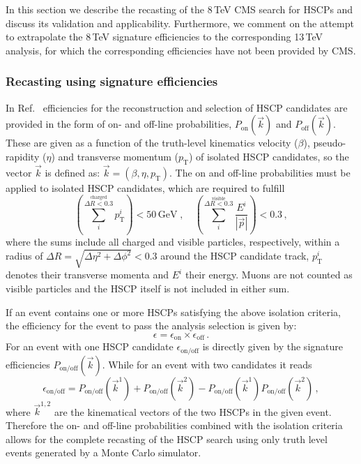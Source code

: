 In this section we describe the recasting of the 8\,TeV CMS
search for HSCPs and discuss its validation and applicability.
Furthermore, we comment on the attempt to extrapolate
the 8\,TeV signature efficiencies to the corresponding 13\,TeV analysis, for
which the corresponding efficiencies have not been provided by CMS\@.


\subsubsection{Recasting using signature efficiencies}\label{sec:signatureeff}


In Ref.~\cite{Khachatryan:2015lla} efficiencies for the reconstruction
and selection of HSCP candidates are provided in the form of on- and
off-line probabilities, $P_\text{on}(\vec{k})$ and $P_\text{off}(\vec{k})$.
These are given as a function of the truth-level kinematics 
velocity ($\beta$), pseudo-rapidity ($\eta$) and 
transverse momentum ($p_\text{T}$) of isolated HSCP candidates, so
the vector $\vec{k}$ is defined as: $\vec{k}=(\beta,\eta,p_\text{T})$.
The on and off-line probabilities must be applied to 
isolated HSCP candidates, which are required to fulfill
\begin{equation}
\left( \sum_{i}^{\stackrel{\text{charged}}{\Delta R<0.3}} \!p_\text{T}^{i}
\right)  < 50\,\text{GeV}
\;,\quad
\left(
\sum_{i}^{\stackrel{\text{visible}}{\Delta R<0.3}}  \frac{E^i}{
|\vec{p}|} \right)  < 0.3\,,
\label{eq:GenTkIso1}
\end{equation}
where the sums include all charged and visible particles, respectively,
within a radius of $\Delta R=\sqrt{\Delta\eta^2+\Delta \phi^2}<0.3$ around the
HSCP candidate track, $p_\text{T}^{i}$ denotes their transverse momenta and $E^i$ 
their energy. Muons are not counted as visible particles and the HSCP itself 
is not included in either sum. 


If an event contains one or more HSCPs satisfying the above isolation
criteria, the efficiency for the event to pass the analysis selection is
given by:
\begin{equation}
\label{eq:Technique}
\epsilon = \epsilon_{\text{on}} \times \epsilon_{\text{off}}
\,.
\end{equation}
For an event with one HSCP candidate $\epsilon_{\text{on/off}}$ is
directly given by the signature efficiencies $P_{\text{on/off}}(\vec{k})$.
While for an event with two candidates it reads~\cite{Khachatryan:2015lla}
\begin{equation}
\label{eq:EventAcceptance}
\epsilon_{\text{on}/\text{off}}
= P_{\text{on}/\text{off}}(\vec{k}^1)  + P_{\text{on}/\text{off}}(\vec{k}^2) 
- P_{\text{on}/\text{off}}(\vec{k}^1)  P_{\text{on}/\text{off}}(\vec{k}^2)  \,,
\end{equation}
where $\vec{k}^{1,2}$ are the kinematical vectors of the two HSCPs in the given
event. Therefore the on- and off-line probabilities combined with the isolation
criteria allows for the complete recasting of the HSCP search using only truth
level events generated by a Monte Carlo simulator.


